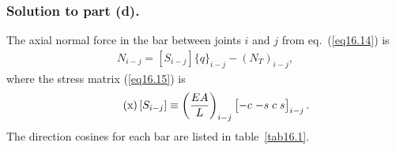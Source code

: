 \documentclass{AeroStructure-ERJohnson}
\begin{document}
\begin{example}
\subsubsection{Solution to part (d).} The axial normal force in the bar between joints $i$ and $j$ from eq.~(\ref{eq16.14}) is
\begin{align}\label{eq16.2w}\tag{w}
N_{i-j}=\left[S_{i-j}\right]\{q\}_{i-j}-\left(N_{T}\right)_{i-j},
\end{align}
where the stress matrix (\ref{eq16.15}) is
\begin{align}\label{eq16.2x}\tag{x}
\left[S_{i-j}\right] \equiv\left(\frac{E A}{L}\right)_{i-j}\left[\begin{array}{@{}l@{\;}l@{\;}l@{\;}l@{}}-c & -s & c & s\end{array}\right]_{i-j}.
\end{align}
The direction cosines for each bar are listed in table~\ref{tab16.1}.


\end{example}
\end{document}
